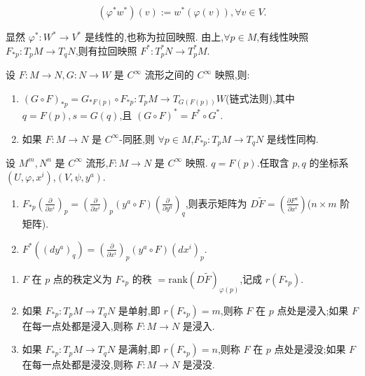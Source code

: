 \[
(\varphi^*w^*) (v) := w^*(\varphi(v)), \forall v \in V.
\]

显然 $\varphi^* : W^* \to V^*$ 是线性的,也称为拉回映照.
由上,$\forall p \in M$,有线性映照 $F_{*p} : T_pM \to T_qN$,则有拉回映照 $F^* : T_p^*N \to T_p^*M$.

\begin{proposition}
设 $F : M \to N, G : N \to W$ 是 $C^\infty$ 流形之间的 $C^\infty$ 映照,则:
\begin{enumerate}
    \item $(G \circ F)_{*p} = G_{*F(p)} \circ F_{*p} : T_pM \to T_{G(F(p))}W$(链式法则),其中 $q = F(p), s = G(q)$,且 $(G \circ F)^* = F^* \circ G^*$.
    \item 如果 $F: M \to N$ 是 $C^\infty$-同胚,则 $\forall p \in M$,$F_{*p}: T_pM \to T_qN$ 是线性同构.
\end{enumerate}
\end{proposition}

设 $M^m, N^n$ 是 $C^\infty$ 流形,$F: M \to N$ 是 $C^\infty$ 映照.
$q = F(p)$.任取含 $p, q$ 的坐标系 $(U, \varphi, x^i)$,$(V, \psi, y^a)$.

\begin{proposition}
\begin{enumerate}
    \item $F_{*p}(\frac{\partial}{\partial x^i})_p = (\frac{\partial}{\partial x^i})_p(y^a \circ F)(\frac{\partial}{\partial y^a})_q$,则表示矩阵为 $D\tilde{F} = (\frac{\partial F^a}{\partial x^i})$($n \times m$ 阶矩阵).
    \item $F^*((dy^a)_q) = (\frac{\partial}{\partial x^i})_p(y^a \circ F)(dx^i)_p$.
\end{enumerate}
\end{proposition}

\begin{definition}
\begin{enumerate}
    \item $F$ 在 $p$ 点的秩定义为 $F_{*p}$ 的秩 $= \text{rank}(D\tilde{F})_{\varphi(p)}$,记成 $r(F_{*p})$.
    \item 如果 $F_{*p}: T_pM \to T_qN$ 是单射,即 $r(F_{*p}) = m$,则称 $F$ 在 $p$ 点处是浸入;如果 $F$ 在每一点处都是浸入,则称 $F: M \to N$ 是浸入.
    \item 如果 $F_{*p}: T_pM \to T_qN$ 是满射,即 $r(F_{*p}) = n$,则称 $F$ 在 $p$ 点处是浸没;如果 $F$ 在每一点处都是浸没,则称 $F: M \to N$ 是浸没.
\end{enumerate}
\end{definition}


